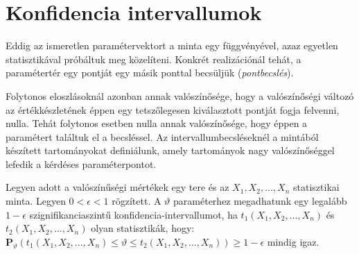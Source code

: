 \section{Konfidencia intervallumok}

Eddig az ismeretlen paramétervektort a minta egy függvényével, azaz egyetlen statisztikával próbáltuk meg közelíteni. Konkrét realizációnál tehát, a paramétertér egy pontját egy másik ponttal becsüljük (\emph{pontbecslés}).

Folytonos eloszlásoknál azonban annak valószínősége, hogy a valószínőségi változó az értékkészletének éppen egy tetszőlegesen kiválasztott pontját fogja felvenni, nulla. Tehát folytonos esetben nulla annak valószínősége, hogy éppen a paramétert találtuk el a becsléssel. Az intervallumbecsléseknél a mintából készített tartományokat definiálunk, amely tartományok nagy valószínőséggel lefedik a kérdéses paraméterpontot.

Legyen adott a valószínűségi mértékek egy tere és az $X_1, X_2, ..., X_n$ statisztikai minta. Legyen $0<\epsilon<1$ rögzített. A $\vartheta$ paraméterhez megadhatunk egy legalább $1-\epsilon$ szignifikanciaszintű konfidencia-intervallumot, ha $t_1(X_1, X_2, ..., X_n)$ és $t_2(X_1, X_2, ..., X_n)$ olyan statisztikák, hogy:
$\mathbf{P}_\vartheta(t_1(X_1, X_2, ..., X_n) \leq \vartheta \leq t_2(X_1, X_2, ..., X_n)) \geq 1-\epsilon$ mindig igaz.

